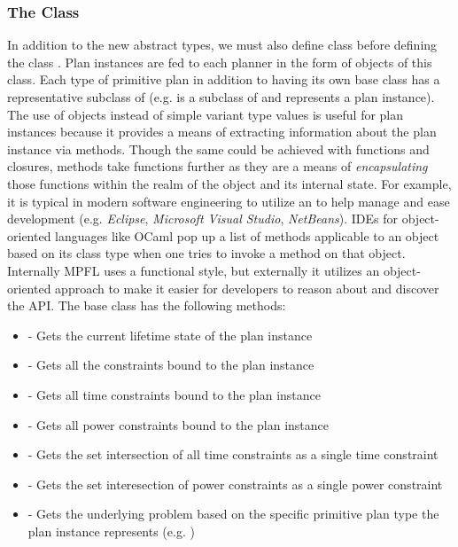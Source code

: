 \subsubsection{The Class }
In addition to the new abstract types, we must also define class  before defining the class . Plan instances are fed to each planner in the form of objects of this class. Each type of primitive plan in addition to having its own  base class has a representative subclass of  (e.g.  is a subclass of  and represents a  plan instance). The use of objects instead of simple variant type values is useful for plan instances because it provides a means of extracting information about the plan instance via methods. Though the same could be achieved with functions and closures, methods take functions further as they are a means of \emph{encapsulating} those functions within the realm of the object and its internal state. For example, it is typical in modern software engineering to utilize an  to help manage and ease development (e.g. \textit{Eclipse}, \textit{Microsoft Visual Studio}, \textit{NetBeans}). IDEs for object-oriented languages like OCaml pop up a list of methods applicable to an object based on its class type when one tries to invoke a method on that object. Internally MPFL uses a functional style, but externally it utilizes an object-oriented approach to make it easier for developers to reason about and discover the API. The base class  has the following methods:

\begin{itemize}
\item {} - Gets the current lifetime state of the plan instance
\item {} - Gets all the constraints bound to the plan instance
\item {} - Gets all time constraints bound to the plan instance
\item {} - Gets all power constraints bound to the plan instance
\item {} - Gets the set intersection of all time constraints as a single time constraint
\item {} - Gets the set interesection of power constraints as a single power constraint
\item {} - Gets the underlying problem based on the specific primitive plan type the plan instance represents (e.g. )
\end{itemize}

